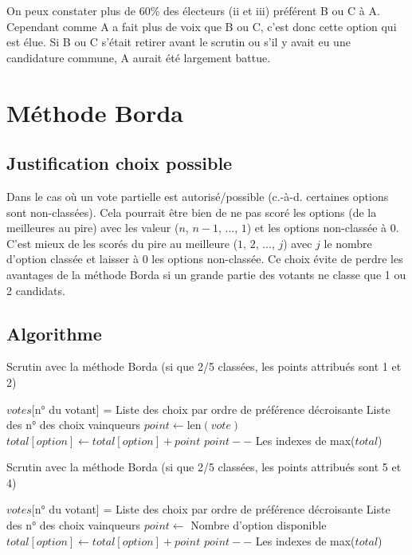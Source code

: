\documentclass[../report]{subfiles}
\begin{document}
  On peux constater plus de 60\% des électeurs (ii et iii) préférent B ou C à A. 
  Cependant comme A a fait plus de voix que B ou C, c'est donc cette option qui est élue.
  Si B ou C s'était retirer avant le scrutin ou s'il y avait eu une candidature commune, A aurait été largement battue. 


  \section{Méthode Borda}

  \subsection{Justification choix possible}

  Dans le cas où un vote partielle est autorisé/possible (c.-à-d. certaines options sont 
  non-classées).
  Cela pourrait être bien de ne pas scoré les options (de la meilleures au pire)
  avec les valeur ($n$, $n-1$, ..., $1$) et les options non-classée à $0$.
  C'est mieux de les scorés du pire au meilleure ($1$, $2$, ..., $j$) avec $j$ le nombre
  d'option classée et laisser à $0$ les options non-classée.
  Ce choix évite de perdre les avantages de la méthode Borda si un grande partie des votants
  ne classe que 1 ou 2 candidats.
  \cite{emerson_original_2013}
  
  \subsection{Algorithme}

  \begin{algorithm}[H]
  \caption{Scrutin avec la méthode Borda (si que 2/5 classées, les points attribués sont 1 et 2)}
  \label{scrutin:borda-max-nbclassee}
  \begin{algorithmic}[1]
  \REQUIRE $votes$[n° du votant] = Liste des choix par ordre de préférence décroisante
  \ENSURE Liste des n° des choix vainqueurs
    \STATE $point \leftarrow \text{len}(vote)$
      \STATE $total[option] \leftarrow total[option] + point$
      \STATE $point--$
    \ENDFOR
  \ENDFOR
  \RETURN Les indexes de max($total$)
  \end{algorithmic}
  \end{algorithm}
  
  \begin{algorithm}[H]
  \caption{Scrutin avec la méthode Borda (si que 2/5 classées, les points attribués sont 5 et 4)}
  \label{scrutin:borda-max-nboption}
  \begin{algorithmic}[1]
  \REQUIRE $votes$[n° du votant] = Liste des choix par ordre de préférence décroisante
  \ENSURE Liste des n° des choix vainqueurs
    \STATE $point \leftarrow $ Nombre d'option disponible
      \STATE $total[option] \leftarrow total[option] + point$
      \STATE $point--$
    \ENDFOR
  \ENDFOR
  \RETURN Les indexes de max($total$)
  \end{algorithmic}
  \end{algorithm}
  
\end{document}
